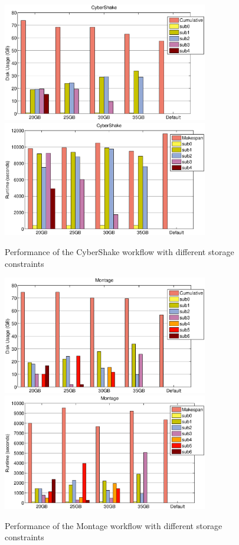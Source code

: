 \begin{figure}[h!]
	\centering
    \includegraphics[width=0.8\textwidth]{figures/partitioning/cybershake_usage.eps}
 \includegraphics[width=0.8\textwidth]{figures/partitioning/cybershake_makespan.eps}
    \caption{Performance of the CyberShake workflow with different storage constraints}
    \label{fig:cybershake}
\end{figure}



\begin{figure}[h!]
	\centering
    \includegraphics[width=0.8\textwidth]{figures/partitioning/montage_usage.eps}
    \includegraphics[width=0.8\textwidth]{figures/partitioning/montage_makespan.eps}
    \caption{Performance of the Montage workflow with different storage constraints}
    \label{fig:montage}
\end{figure}

